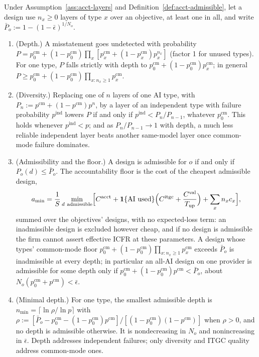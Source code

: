 \begin{proposition}\label{prop:acct-amin}
Under Assumption~\ref{ass:acct-layers} and Definition~\ref{def:acct-admissible}, let a design use $n_x\ge 0$ layers of type $x$ over an objective, at least one in all, and write $\bar P_o:=1-(1-\bar\epsilon)^{1/N_o}$.
\begin{enumerate}
\item[(a)] (Depth.) A misstatement goes undetected with probability $P=p^{\mathrm{cm}}_0+(1-p^{\mathrm{cm}}_0)\prod_x[p^{\mathrm{cm}}_x+(1-p^{\mathrm{cm}}_x)p_x^{n_x}]$ (factor 1 for unused types). For one type, $P$ falls strictly with depth to $p^{\mathrm{cm}}_0+(1-p^{\mathrm{cm}}_0)p^{\mathrm{cm}}_x$; in general $P\ge p^{\mathrm{cm}}_0+(1-p^{\mathrm{cm}}_0)\prod_{x:n_x\ge1}p^{\mathrm{cm}}_x$.
\item[(b)] (Diversity.) Replacing one of $n$ layers of one AI type, with $P_n:=p^{\mathrm{cm}}+(1-p^{\mathrm{cm}})p^n$, by a layer of an independent type with failure probability $p^{\mathrm{ind}}$ lowers $P$ if and only if $p^{\mathrm{ind}}<P_n/P_{n-1}$, whatever $p^{\mathrm{cm}}_0$. This holds whenever $p^{\mathrm{ind}}<p$; and as $P_n/P_{n-1}\to 1$ with depth, a much less reliable independent layer beats another same-model layer once common-mode failure dominates.
\item[(c)] (Admissibility and the floor.) A design is admissible for $o$ if and only if $P_o(d)\le\bar P_o$. The accountability floor is the cost of the cheapest admissible design,
\begin{equation}\label{eq:acct-amin}
a_{\min}=\frac1S\min_{d\ \text{admissible}}\Bigl[C^{\mathrm{acct}}+\mathbf 1\{\text{AI used}\}\Bigl(C^{\mathrm{itgc}}+\frac{C^{\mathrm{val}}}{T_{\mathrm{up}}}\Bigr)+\sum_xn_xc_x\Bigr],
\end{equation}
summed over the objectives' designs, with no expected-loss term: an inadmissible design is excluded however cheap, and if no design is admissible the firm cannot assert effective ICFR at these parameters. A design whose types' common-mode floor $p^{\mathrm{cm}}_0+(1-p^{\mathrm{cm}}_0)\prod_{x:n_x\ge1}p^{\mathrm{cm}}_x$ exceeds $\bar P_o$ is inadmissible at every depth; in particular an all-AI design on one provider is admissible for some depth only if $p^{\mathrm{cm}}_0+(1-p^{\mathrm{cm}}_0)p^{\mathrm{cm}}<\bar P_o$, about $N_o(p^{\mathrm{cm}}_0+p^{\mathrm{cm}})<\bar\epsilon$.
\item[(d)] (Minimal depth.) For one type, the smallest admissible depth is $n_{\min}=\lceil\ln\rho/\ln p\rceil$ with $\rho:=[\bar P_o-p^{\mathrm{cm}}_0-(1-p^{\mathrm{cm}}_0)p^{\mathrm{cm}}]/[(1-p^{\mathrm{cm}}_0)(1-p^{\mathrm{cm}})]$ when $\rho>0$, and no depth is admissible otherwise. It is nondecreasing in $N_o$ and nonincreasing in $\bar\epsilon$. Depth addresses independent failures; only diversity and ITGC quality address common-mode ones.

\end{enumerate}
\end{proposition}
